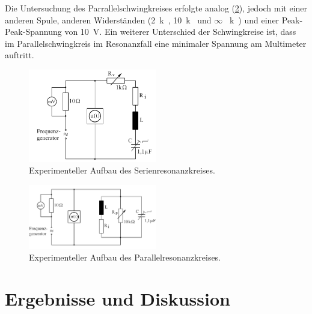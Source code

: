 \documentclass[
	a4paper,
	12pt,
	pagesize,
	ngerman
]{scrartcl}
\begin{document}
	Die Untersuchung des Parrallelschwingkreises erfolgte analog (\cref{parallelAufbau}), jedoch mit einer anderen Spule, anderen Widerständen (\SI{2}{k\Omega}, \SI{10}{k\Omega} und $\infty$ \SI{}{k\Omega}) und einer Peak-Peak-Spannung von \SI{10}{V}.
	Ein weiterer Unterschied der Schwingkreise ist, dass im Parallelschwingkreis im Resonanzfall eine minimaler Spannung am Multimeter auftritt.
	\begin{figure}[H]
		\includegraphics[width=0.5\textwidth]{serieAufbau}
		\centering
		\caption{Experimenteller Aufbau des Serienresonanzkreises.\cite{WWU}} %
		\label{serieAufbau}
		\centering
	\end{figure} 
		\begin{figure}[H]
		\includegraphics[width=0.5\textwidth]{parallelAufbau}
		\centering
		\caption{Experimenteller Aufbau des Parallelresonanzkreises.\cite{WWU}} %
		\label{parallelAufbau}
		\centering
	\end{figure}

	

	\section{Ergebnisse und Diskussion}
\end{document}

